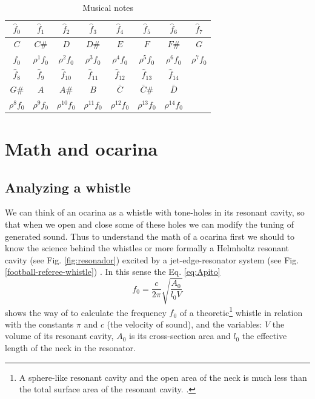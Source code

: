 \documentclass{article}
\begin{document}
\begin{table}[h]
\center
{\renewcommand{\arraystretch}{1.5}
\begin{tabular}{|c|c|c|c|c|c|c|c|}
\hline
$\hat{f}_{0}$ & $\hat{f}_{1}$ & $\hat{f}_{2}$ & $\hat{f}_{3}$ & $\hat{f}_{4}$ & $\hat{f}_{5}$ & $\hat{f}_{6}$ & $\hat{f}_{7}$ \\ \hline
$C$ & $C\#$ & $D$ & $D\#$ & $E$ & $F$ & $F\#$ & $G$ \\ \hline
$f_{0}$ & ${\rho}^1 f_{0}$ & ${\rho}^2 f_{0}$ & ${\rho}^3 f_{0}$ & ${\rho}^4 f_{0}$ & ${\rho}^5 f_{0}$ & ${\rho}^6 f_{0}$ & ${\rho}^7 f_{0}$  \\ \hline
\hline 
$\hat{f}_{8}$ & $\hat{f}_{9}$ & $\hat{f}_{10}$ & $\hat{f}_{11}$ & $\hat{f}_{12}$ & $\hat{f}_{13}$ & $\hat{f}_{14}$ & ~ \\ \hline
$G\#$ & $A$ & $A\#$ & $B$ & $\bar{C}$ & $\bar{C}\#$ & $\bar{D}$  & ~\\ \hline
${\rho}^8 f_{0}$ & ${\rho}^9 f_{0}$ & ${\rho}^{10} f_{0}$ & ${\rho}^{11} f_{0}$ & ${\rho}^{12} f_{0}$ & ${\rho}^{13} f_{0}$ & ${\rho}^{14} f_{0}$ & ~ \\ 
\hline
\end{tabular}
}
\vspace{5pt}
\caption{Musical notes}
\label{tab:notes}
\end{table}


\section{Math and ocarina}

\subsection{Analyzing a whistle}
We can think of an ocarina as a whistle with tone-holes in its resonant cavity,
so that when we open and close some of these holes we can modify the tuning of generated sound.
Thus to understand the math of a ocarina first we should to know the science behind the whistles  
or more formally a Helmholtz resonant cavity \cite{corning2011resonance} (see Fig. \ref{fig:resonador}) excited by a jet-edge-resonator system (see Fig. \ref{football-referee-whistle}) \cite[pp. 3]{gibiat2013acoustic} \cite[pp. 138]{nyborg1953characteristics}. 
In this sense the Eq. \ref{eq:Apito} 
\begin{equation} 
\label{eq:Apito}
 f_0 = \frac{c}{2 \pi} \sqrt{\frac{A_{0}}{l_{0}V} }  
\end{equation}
shows the way of to calculate the frequency $f_0$ of a theoretic\footnote{A sphere-like resonant cavity and the open area of the neck is much less than the total surface area of the resonant cavity. .} whistle \cite[pp. 3]{gibiat2013acoustic} \cite[pp. 5]{kobayashi20093d} \cite[pp. 265]{okadanumerical}
in relation with the constants $\pi$  and $c$ (the velocity of sound),  and 
the variables: $V$ the volume of its resonant cavity,
$A_0$ is its cross-section area and $l_0$ the effective length of the neck in the resonator.
\end{document}
